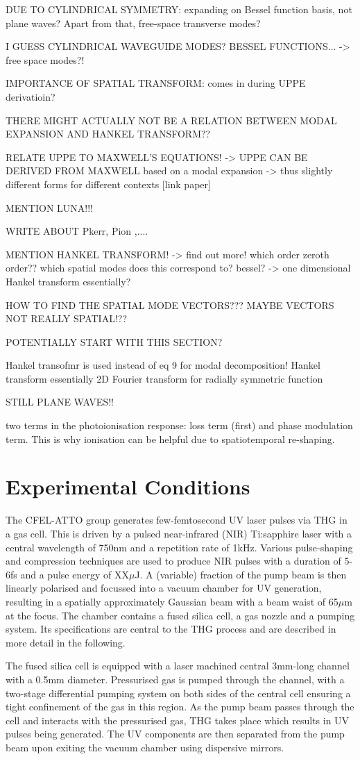 \documentclass[a4paper]{jpconf}
\begin{document}
DUE TO CYLINDRICAL SYMMETRY: expanding on Bessel function basis, not plane waves? Apart from that, free-space transverse modes?

I GUESS CYLINDRICAL WAVEGUIDE MODES? BESSEL FUNCTIONS...
		-> free space modes?!
		
		IMPORTANCE OF SPATIAL TRANSFORM: comes in during UPPE derivatioin?

THERE MIGHT ACTUALLY NOT BE A RELATION BETWEEN MODAL EXPANSION AND HANKEL TRANSFORM??


RELATE UPPE TO MAXWELL'S EQUATIONS!
		-> UPPE CAN BE DERIVED FROM MAXWELL based on a modal expansion  -> thus slightly different forms for different contexts [link paper]

MENTION LUNA!!!

WRITE ABOUT Pkerr, Pion ,....

MENTION HANKEL TRANSFORM! -> find out more! which order zeroth order?? which spatial modes does this correspond to? bessel? -> one dimensional Hankel transform essentially?

HOW TO FIND THE SPATIAL MODE VECTORS???
	MAYBE VECTORS NOT REALLY SPATIAL!??

POTENTIALLY START WITH THIS SECTION?

Hankel transofmr is used instead of eq 9 for modal decomposition! Hankel transform essentially 2D Fourier transform for radially symmetric function

STILL PLANE WAVES!!


two terms in the photoionisation response: loss term (first) and phase modulation term. This is why ionisation can be helpful due to spatiotemporal re-shaping.

\section{Experimental Conditions}
The CFEL-ATTO group generates few-femtosecond UV laser pulses via THG in a gas cell. This is driven by a pulsed near-infrared (NIR) Ti:sapphire laser with a central wavelength of 750nm and a repetition rate of 1kHz. Various pulse-shaping and compression techniques are used to produce NIR pulses with a duration of 5-6fs and a pulse energy of XX$\mu$J. A (variable) fraction of the pump beam is then linearly polarised and focussed into a vacuum chamber for UV generation, resulting in a spatially approximately Gaussian beam with a beam waist of 65$\mu$m at the focus. The chamber contains a fused silica cell, a gas nozzle and a pumping system. Its specifications are central to the THG process and are described in more detail in the following. \par 
The fused silica cell is equipped with a laser machined central 3mm-long channel with a 0.5mm diameter. Pressurised gas is pumped through the channel, with a two-stage differential pumping system on both sides of the central cell ensuring a tight confinement of the gas in this region. As the pump beam passes through the cell and interacts with the pressurised gas, THG takes place which results in UV pulses being generated. The UV components are then separated from the pump beam upon exiting the vacuum chamber using dispersive mirrors. 
\end{document}
